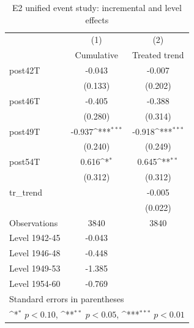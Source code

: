 \begin{table}[htbp]\centering
\def\sym#1{\ifmmode^{#1}\else\(^{#1}\)\fi}
\caption{E2 unified event study: incremental and level effects}
\begin{tabular}{l*{2}{c}}
\toprule
                    &\multicolumn{1}{c}{(1)}&\multicolumn{1}{c}{(2)}\\
                    &\multicolumn{1}{c}{Cumulative}&\multicolumn{1}{c}{Treated trend}\\
\midrule
post42T             &      -0.043         &      -0.007         \\
                    &     (0.133)         &     (0.202)         \\
\addlinespace
post46T             &      -0.405         &      -0.388         \\
                    &     (0.280)         &     (0.314)         \\
\addlinespace
post49T             &      -0.937\sym{***}&      -0.918\sym{***}\\
                    &     (0.240)         &     (0.249)         \\
\addlinespace
post54T             &       0.616\sym{*}  &       0.645\sym{**} \\
                    &     (0.312)         &     (0.312)         \\
\addlinespace
tr\_trend            &                     &      -0.005         \\
                    &                     &     (0.022)         \\
\midrule
Observations        &        3840         &        3840         \\
Level 1942-45       &      -0.043         &                     \\
Level 1946-48       &      -0.448         &                     \\
Level 1949-53       &      -1.385         &                     \\
Level 1954-60       &      -0.769         &                     \\
\bottomrule
\multicolumn{3}{l}{\footnotesize Standard errors in parentheses}\\
\multicolumn{3}{l}{\footnotesize \sym{*} \(p<0.10\), \sym{**} \(p<0.05\), \sym{***} \(p<0.01\)}\\
\end{tabular}
\end{table}
